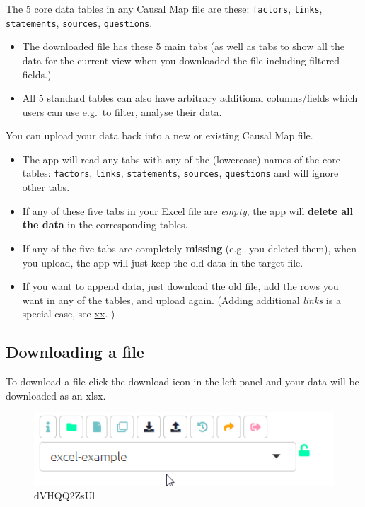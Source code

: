 \documentclass[
]{book}
\providecommand{\tightlist}{%
  \setlength{\itemsep}{0pt}\setlength{\parskip}{0pt}}
\begin{document}
The 5 core data tables in any Causal Map file are these: \texttt{factors}, \texttt{links}, \texttt{statements}, \texttt{sources}, \texttt{questions}.

\begin{itemize}
\tightlist
\item
  The downloaded file has these 5 main tabs (as well as tabs to show all the data for the current view when you downloaded the file including filtered fields.)
\item
  All 5 standard tables can also have arbitrary additional columns/fields which users can use e.g.~to filter, analyse their data.
\end{itemize}

You can upload your data back into a new or existing Causal Map file.

\begin{itemize}
\tightlist
\item
  The app will read any tabs with any of the (lowercase) names of the core tables: \texttt{factors}, \texttt{links}, \texttt{statements}, \texttt{sources}, \texttt{questions} and will ignore other tabs.
\item
  If any of these five tabs in your Excel file are \emph{empty}, the app will \textbf{delete all the data} in the corresponding tables.
\item
  If any of the five tabs are completely \textbf{missing} (e.g.~you deleted them), when you upload, the app will just keep the old data in the target file.
\item
  If you want to append data, just download the old file, add the rows you want in any of the tables, and upload again. (Adding additional \emph{links} is a special case, see \href{}{xx}. )
\end{itemize}

\hypertarget{downloading-a-file}{%
\subsection{Downloading a file}\label{downloading-a-file}}

To download a file click the download icon in the left panel and your data will be downloaded as an xlsx.

\begin{figure}
\centering
\includegraphics[width=6.77083in,height=\textheight]{_assets/dVHQQ2ZsUl.gif}
\caption{dVHQQ2ZsUl}
\end{figure}
\end{document}
